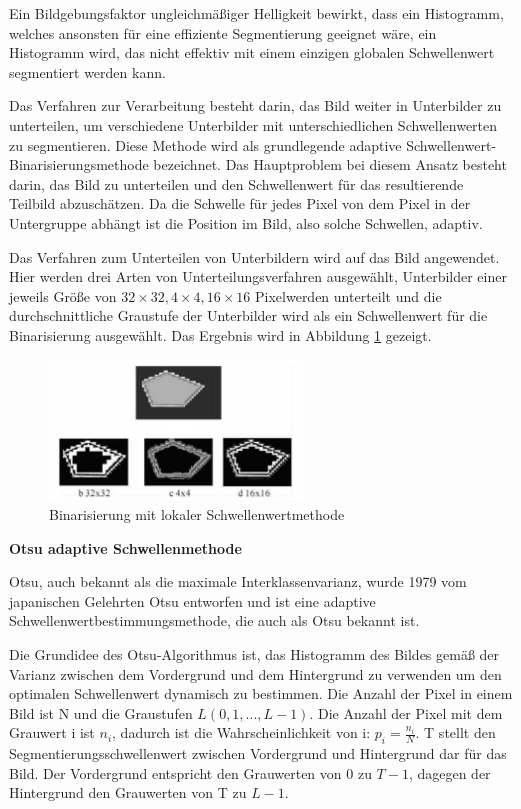 Ein Bildgebungsfaktor ungleichmäßiger Helligkeit bewirkt, dass ein Histogramm, welches ansonsten für eine effiziente Segmentierung geeignet wäre, ein Histogramm wird, das nicht effektiv mit einem einzigen globalen Schwellenwert segmentiert werden kann.

Das Verfahren zur Verarbeitung besteht darin, das Bild weiter in Unterbilder zu unterteilen, um verschiedene Unterbilder mit unterschiedlichen Schwellenwerten zu segmentieren. Diese Methode wird als grundlegende adaptive Schwellenwert-Binarisierungsmethode bezeichnet. Das Hauptproblem bei diesem Ansatz besteht darin, das Bild zu unterteilen und den Schwellenwert für das resultierende Teilbild abzuschätzen. Da die Schwelle für jedes Pixel von dem Pixel in der Untergruppe abhängt ist die Position im Bild, also solche Schwellen, adaptiv. 

Das Verfahren zum Unterteilen von Unterbildern wird auf das Bild angewendet. Hier werden drei Arten von Unterteilungsverfahren ausgewählt, Unterbilder einer jeweils Größe von $ 32\times32, 4 \times4, 16\times16 $ Pixelwerden unterteilt und die durchschnittliche Graustufe der Unterbilder wird als ein Schwellenwert für die Binarisierung ausgewählt. Das Ergebnis wird in Abbildung \ref{fig:Binarisierung mit lokalen Schwellenwertmethode} gezeigt.

\begin{figure}[H]
 \centering 
  \includegraphics[keepaspectratio,width=0.6\textwidth]{images/4_ZweiteErfahrung/Binar/adaptive.pdf}
 \caption{Binarisierung mit lokaler Schwellenwertmethode}
 \label{fig:Binarisierung mit lokalen Schwellenwertmethode}
\end{figure} 

\textbf{Otsu adaptive Schwellenmethode}

Otsu\cite{Ostu}, auch bekannt als die maximale Interklassenvarianz, wurde 1979 vom japanischen Gelehrten Otsu entworfen und ist eine adaptive Schwellenwertbestimmungsmethode, die auch als Otsu bekannt ist.

Die Grundidee des Otsu-Algorithmus ist, das Histogramm des Bildes gemäß der Varianz zwischen dem Vordergrund und dem Hintergrund zu verwenden um den optimalen Schwellenwert dynamisch zu bestimmen. Die Anzahl der Pixel in einem Bild ist N und die Graustufen $ L(0,1,...,L-1) $. Die Anzahl der Pixel mit dem Grauwert i ist $ n_{i} $, dadurch ist die Wahrscheinlichkeit von i: $ p_{i} = \frac{n_{i}}{N} $. T stellt den Segmentierungsschwellenwert zwischen Vordergrund und Hintergrund dar für das Bild. Der Vordergrund entspricht den Grauwerten von 0 zu $ T-1 $, dagegen der Hintergrund den Grauwerten von T zu $ L -1 $.

